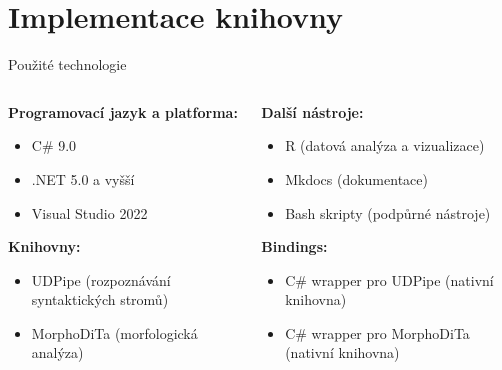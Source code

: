 \documentclass[lualatex,hyperref={pdfencoding=auto}]{beamer}
\begin{document}
\section{Implementace knihovny}
\begin{frame}{Použité technologie}
    \begin{columns}[t] 
        \begin{column}{0.5\textwidth}
            \vspace{0pt} %
            \textbf{Programovací jazyk a platforma:}
            \begin{itemize}
                \item C\# 9.0
                \item .NET 5.0 a vyšší
                \item Visual Studio 2022
            \end{itemize}
            \vspace{12pt}
            \textbf{Knihovny:}
            \begin{itemize}
                \item UDPipe 
                (rozpoznávání syntaktických stromů)
                \item MorphoDiTa (morfologická analýza)
            \end{itemize}
        \end{column}
        \begin{column}{0.5\textwidth}
            \vspace{0pt} %
            \textbf{Další nástroje:}
            \begin{itemize}
                \item R (datová analýza a vizualizace)
                \item Mkdocs (dokumentace)
                \item Bash skripty (podpůrné nástroje)
            \end{itemize}
            
            \textbf{Bindings:}
            \begin{itemize}
                \item C\# wrapper pro UDPipe (nativní knihovna)
                \item C\# wrapper pro MorphoDiTa (nativní knihovna)
            \end{itemize}
        \end{column}
    \end{columns}
\end{frame}
\end{document}
